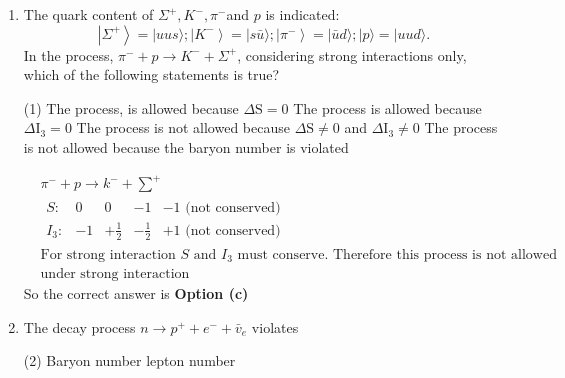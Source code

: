 \begin{enumerate}
	(3) $\pi^0+\mathrm{n} \rightarrow \pi^{-}+\mathrm{p}$\hspace{2.6cm}
	(iii) Weak
	{}
	\begin{tasks}(2)
		\task[\textbf{a.}]$(1$, iii), (2, ii), (3, i)
		\task[\textbf{b.}]$(1$, i), (2, ii), (3, iii)
		\task[\textbf{c.}](1, ii), (2, i), (3, iii)
		\task[\textbf{d.}](1, iii), (2, i), (3, ii) 
	\end{tasks}
	\begin{answer}
		So the correct answer is \textbf{Option (a)}
	\end{answer}
	\item  The quark content of $\Sigma^{+}, K^{-}, \pi^{-}$and $p$ is indicated:
	$$
	\left|\Sigma^{+}\right\rangle=|u u s\rangle ;\left|K^{-}\right\rangle=|s \bar{u}\rangle ;\left|\pi^{-}\right\rangle=|\bar{u} d\rangle ;|p\rangle=|u u d\rangle .
	$$
	In the process, $\pi^{-}+p \rightarrow K^{-}+\Sigma^{+}$, considering strong interactions only, which of the following statements is true?
	{}
	\begin{tasks}(1)
		\task[\textbf{a.}]The process, is allowed because $\Delta \mathrm{S}=0$
		\task[\textbf{b.}] The process is allowed because $\Delta \mathrm{I}_3=0$
		\task[\textbf{c.}] The process is not allowed because $\Delta \mathrm{S} \neq 0$ and $\Delta \mathrm{I}_3 \neq 0$
		\task[\textbf{d.}]The process is not allowed because the baryon number is violated 
	\end{tasks}
	\begin{answer}
		\begin{align*}
		&\pi^{-}+p \rightarrow k^{-}+\sum^{+}\\
		&\begin{array}{ccccc}
		S: & 0 & 0 & -1 & -1 \text { (not conserved) } \\
		I_3: & -1 & +\frac{1}{2} & -\frac{1}{2} & +1 \text { (not conserved) }
		\end{array}\\
		&\text{For strong interaction $S$ and $I_3$ must conserve. Therefore this process is not allowed }\\
		&\text{under strong interaction}
		\end{align*}
		So the correct answer is \textbf{Option (c)}
	\end{answer}
	\item  The decay process $n \rightarrow p^{+}+e^{-}+\bar{v}_e$ violates
	{}
	\begin{tasks}(2)
		\task[\textbf{a.}]Baryon number
		\task[\textbf{b.}] lepton number

\end{tasks}
\end{enumerate}
